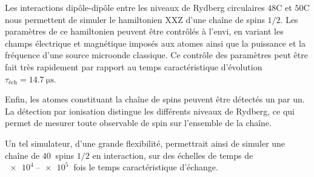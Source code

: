 Les interactions dipôle-dipôle entre les niveaux de Rydberg circulaires $\mathrm{48C}$ et $\mathrm{50C}$ nous permettent de simuler le hamiltonien XXZ d'une chaîne de spins $1/2$.
Les paramètres de ce hamiltonien peuvent être contrôlés à l'envi, en variant les champs électrique et magnétique imposés aux atomes ainsi que la puissance et la fréquence d'une source microonde classique.
Ce contrôle des paramètres peut être fait très rapidement par rapport au temps caractéristique d'évolution $\tau_{\text{\'ech}} = \SI{14.7}{\us}$.

Enfin, les atomes constituant la chaîne de spins peuvent être détectés un par un.
La détection par ionisation distingue les différents niveaux de Rydberg, ce qui permet de mesurer toute observable de spin sur l'ensemble de la chaîne.

Un tel simulateur, d'une grande flexibilité, permettrait ainsi de simuler une chaîne de $\SI{40}{}$ spins $1/2$ en interaction, sur des échelles de temps de $\SIrange{e4}{e5}{}$ fois le temps caractéristique d'échange.















